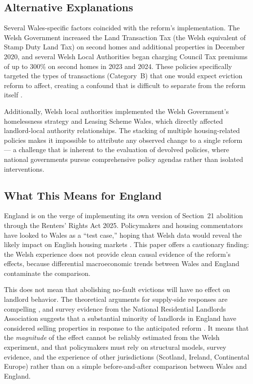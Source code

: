 \documentclass[12pt]{article}
\begin{document}
\subsection{Alternative Explanations}

Several Wales-specific factors coincided with the reform's implementation. The Welsh Government increased the Land Transaction Tax (the Welsh equivalent of Stamp Duty Land Tax) on second homes and additional properties in December 2020, and several Welsh Local Authorities began charging Council Tax premiums of up to 300\% on second homes in 2023 and 2024. These policies specifically targeted the types of transactions (Category~B) that one would expect eviction reform to affect, creating a confound that is difficult to separate from the reform itself \citep{hilber2016impact}.

Additionally, Welsh local authorities implemented the Welsh Government's homelessness strategy and Leasing Scheme Wales, which directly affected landlord-local authority relationships. The stacking of multiple housing-related policies makes it impossible to attribute any observed change to a single reform --- a challenge that is inherent to the evaluation of devolved policies, where national governments pursue comprehensive policy agendas rather than isolated interventions.

\subsection{What This Means for England}

England is on the verge of implementing its own version of Section~21 abolition through the Renters' Rights Act 2025. Policymakers and housing commentators have looked to Wales as a ``test case,'' hoping that Welsh data would reveal the likely impact on English housing markets \citep{wilson2023renters}. This paper offers a cautionary finding: the Welsh experience does not provide clean causal evidence of the reform's effects, because differential macroeconomic trends between Wales and England contaminate the comparison.

This does not mean that abolishing no-fault evictions will have no effect on landlord behavior. The theoretical arguments for supply-side responses are compelling \citep{arnott2003tenancy, diamond2019effects}, and survey evidence from the National Residential Landlords Association suggests that a substantial minority of landlords in England have considered selling properties in response to the anticipated reform \citep{simcock2021landlord}. It means that the \textit{magnitude} of the effect cannot be reliably estimated from the Welsh experiment, and that policymakers must rely on structural models, survey evidence, and the experience of other jurisdictions (Scotland, Ireland, Continental Europe) rather than on a simple before-and-after comparison between Wales and England.
\end{document}
